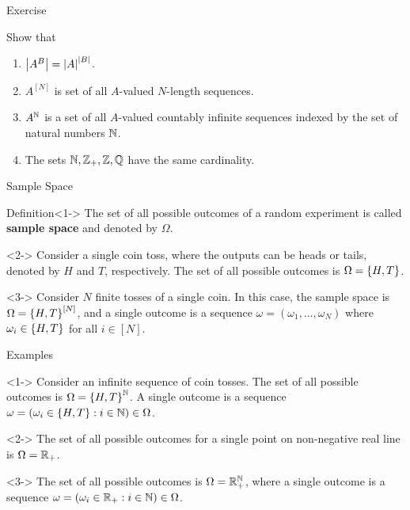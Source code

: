 \documentclass[12pt,aspectratio=169]{beamer}
\begin{document}
\begin{frame}{Exercise}
    \begin{block}{Show that}
        \begin{enumerate}
            \item $\left\lvert A^B\right\rvert = \left\lvert A\right\rvert^{\left\lvert B\right\rvert}$. 
            \item $A^{[N]}$ is set of all $A$-valued $N$-length sequences. 
            \item $A^{\mathbb{N}}$ is a set of all $A$-valued countably infinite sequences indexed by the set of natural numbers $\mathbb{N}$.
            \item The sets $\mathbb{N}, \mathbb{Z}_+, \mathbb{Z}, \mathbb{Q}$ have the same cardinality. 
        \end{enumerate}
    \end{block}
\end{frame}

\begin{frame}{Sample Space} 
    \begin{block}{Definition}<1->
        The set of all possible outcomes of a random experiment is called \textbf{sample space} and denoted by $\Omega$. 
    \end{block}
    \begin{Example}<2->
        Consider a single coin toss, where the outputs can be heads or tails, denoted by $H$ and $T$, respectively.
        The set of all possible outcomes is $\Omega = \left\{H, T\right\}$.
    \end{Example}
    \begin{Example}<3->
    Consider $N$ finite tosses of a single coin. In this case, the sample space is $\Omega = \left\{H, T\right\}^{[N]}$, and a single outcome is a sequence $\omega = (\omega_1, \dots, \omega_N)$ where $\omega_i \in \left\{H,T\right\}$ for all $i \in [N]$.  
    \end{Example}
\end{frame}
\begin{frame}{Examples}
    \begin{Example}<1->
        Consider an infinite sequence of coin tosses. 
        The set of all possible outcomes is $\Omega = \left\{H, T\right\}^{\mathbb{N}}$. 
        A single outcome is a sequence $\omega = (\omega_i \in \left\{H,T\right\}: i \in \mathbb{N}) \in \Omega$. 
    \end{Example}

    \begin{Example}<2->
        The set of all possible outcomes for a single point on non-negative real line is $\Omega = \mathbb{R}_+$. 
    \end{Example}
    \begin{Example}<3->
        The set of all possible outcomes is $\Omega = \mathbb{R}_+^{\mathbb{N}}$, where a single outcome is a sequence $\omega = (\omega_i \in \mathbb{R}_+: i \in \mathbb{N}) \in \Omega$. 
    \end{Example}
\end{frame}
\end{document}
